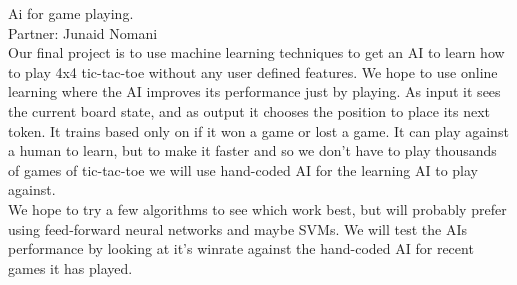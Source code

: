 \documentclass[twoside]{article}
\theoremstyle{definition}
\theoremstyle{definition}
\theoremstyle{remark}
\begin{document}
Ai for game playing.\\
Partner: Junaid Nomani\\
Our final project is to use machine learning techniques to get an AI to learn how to play 4x4 tic-tac-toe without any user defined features. We hope to use online learning where the AI improves its performance just by playing. As input it sees the current board state, and as output it chooses the position to place its next token. It trains based only on if it won a game or lost a game. It can play against a human to learn, but to make it faster and so we don’t have to play thousands of games of tic-tac-toe we will use hand-coded AI for the learning AI to play against. \\
We hope to try a few algorithms to see which work best, but will probably prefer using feed-forward neural networks and maybe SVMs. We will test the AIs performance by looking at it’s winrate against the hand-coded AI for recent games it has played.\\ 
\end{document}
